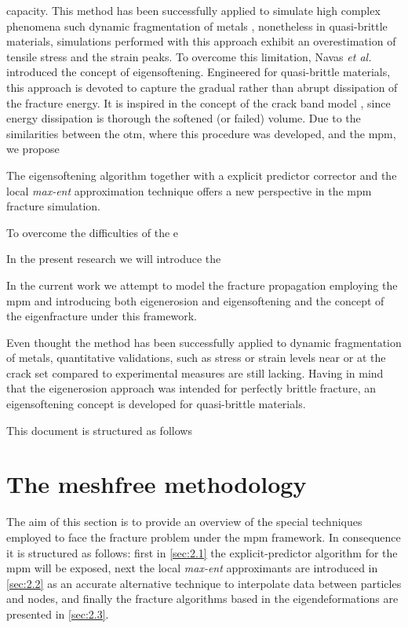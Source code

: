 \message{ !name(2020_EFM_MPM_Eigensoftening.tex)}\documentclass[preprint,12pt,a4paper]{elsarticle}
\begin{document}
capacity. This method has been successfully applied to simulate high
complex phenomena such dynamic fragmentation of metals \cite{Li_2015},
nonetheless in quasi-brittle materials, simulations performed with
this approach exhibit an overestimation of tensile stress and the
strain peaks. To overcome this limitation, Navas {\it et al.}
\cite{Navas_2017_ES,Navas2018a} introduced the concept of
eigensoftening. Engineered for quasi-brittle materials, this approach
is devoted to capture the gradual rather than abrupt dissipation of
the fracture energy. It is inspired in the concept of the crack band
model \cite{Bazant83}, since energy dissipation is thorough the
softened (or failed) volume. Due to the similarities between the \acrshort{otm}, 
where this procedure was developed, and the \acrshort{mpm}, we propose


The eigensoftening algorithm together with a explicit predictor
corrector and the local \textit{max-ent} approximation technique
offers a new perspective in the \acrshort{mpm} fracture simulation.

To overcome the difficulties of the e

In the present research we will introduce the 

In the current work we attempt to model the fracture propagation
employing the \acrshort{mpm} and introducing both eigenerosion and eigensoftening
\cite{Navas_2017_ES,Navas_2018_ES} and the concept of the
eigenfracture under this framework.

Even thought the method has been successfully applied to dynamic
fragmentation of metals, quantitative validations, such as stress or 
strain levels near or at the crack set compared to experimental
measures are still lacking. Having in mind that the eigenerosion
approach was intended for perfectly brittle fracture, an
eigensoftening concept is developed for quasi-brittle materials.

This document is structured as follows 

\section{The meshfree methodology}
\label{sec:2}
The aim of this section is to provide an overview of the special
techniques employed to face the fracture problem under the \acrshort{mpm}
framework. In consequence it is structured as follows: first in
\ref{sec:2.1} the explicit-predictor algorithm for the \acrshort{mpm} will be exposed, next the local \textit{max-ent} approximants are introduced in
\ref{sec:2.2} as an accurate alternative technique to interpolate data
between particles and nodes, and finally the fracture algorithms based
in the eigendeformations are presented in \ref{sec:2.3}.
\end{document}
